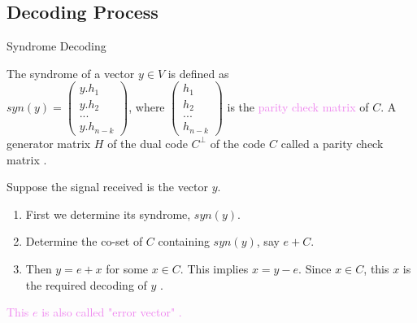 \documentclass{beamer}
\begin{document}
\subsection{Decoding Process}
\begin{frame}{Syndrome Decoding}
  \begin{definition}
  The syndrome of a vector \(y \in V\) is defined as \\ \(syn(y)=\begin{pmatrix}
    y.h_1\\
    y.h_2\\
    ...\\
    y.h_{n-k}
  \end{pmatrix}\), \hspace{12mm} where \(\begin{pmatrix}
    h_1 \\ h_2\\ ...\\ h_{n-k}
  \end{pmatrix}\) is the \textcolor{violet}{parity check matrix} of \(C\). {\footnotesize A generator matrix \(H\) of the dual code \(C^{\perp}\) of the code \(C\) called a parity check matrix \cite{error_correct}}.
 \end{definition}
 \begin{tcolorbox}[colback=white, colframe=brown!80!black, boxsep=0mm, title={Decoding Process}]
 Suppose the signal received is the vector \(y\).
\begin{enumerate}
\item First we determine its syndrome, \(syn(y)\).
\item Determine the co-set of \(C\) containing \(syn(y)\), say \(e + C\).
\item Then \(y=e+x\) for some \(x \in C\). This implies \(x=y-e\). Since \(x \in C\), this \(x\) is the required decoding of \(y\) \cite{error_correct}.
\end{enumerate}
\end{tcolorbox}
\textcolor{violet}{This \(e\) is also called "error vector" \cite{error_correct}.}

\end{frame}
\end{document}
